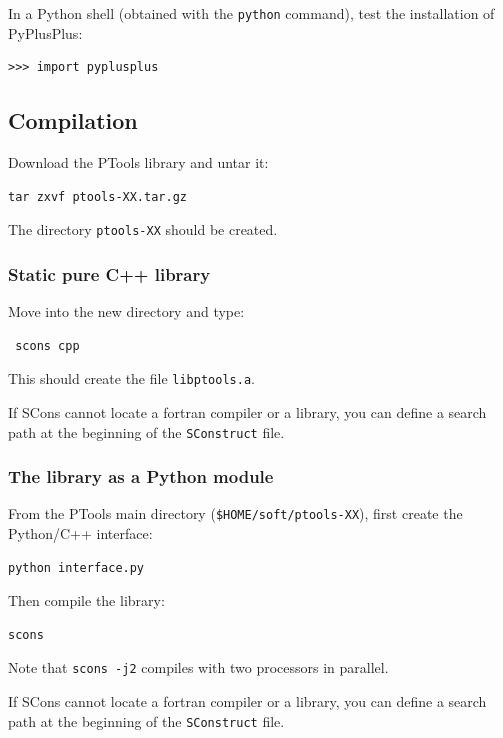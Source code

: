 \documentclass[12pt,a4paper]{article}
\begin{document}
In a Python shell (obtained with the {\tt python} command), test the installation
of PyPlusPlus:
\begin{verbatim}
>>> import pyplusplus
\end{verbatim}






\subsection{Compilation}

Download the PTools library and untar it:

\begin{verbatim}
tar zxvf ptools-XX.tar.gz
\end{verbatim}
The directory {\tt ptools-XX} should be created.


\subsubsection{Static pure C++ library}

Move into the new directory and type:

\begin{verbatim}
 scons cpp
\end{verbatim}

This should create the file {\tt libptools.a}.

If SCons cannot locate a fortran compiler or a library, you can define a search path at the beginning of
the {\tt SConstruct} file.

\subsubsection{The library as a Python module}

From the PTools main directory ({\tt \$HOME/soft/ptools-XX}), 
first create the Python/C++ interface:
\begin{verbatim}
python interface.py
\end{verbatim}

Then compile the library:
\begin{verbatim}
scons
\end{verbatim}

Note that {\tt scons -j2} compiles with two processors in parallel.

If SCons cannot locate a fortran compiler or a library, you can define a search path at the beginning of
the {\tt SConstruct} file.
\end{document}
